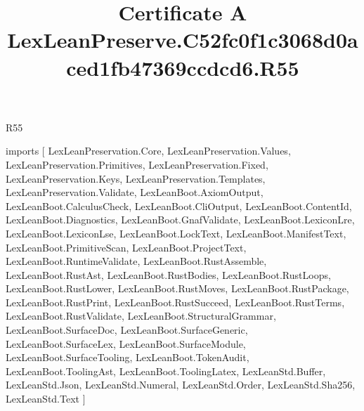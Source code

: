 \begin{lexlean}{R55}
\title{Certificate A LexLeanPreserve.C52fc0f1c3068d0aced1fb47369ccdcd6.R55}
\begin{coremodule}
imports [
  LexLeanPreservation.Core,
  LexLeanPreservation.Values,
  LexLeanPreservation.Primitives,
  LexLeanPreservation.Fixed,
  LexLeanPreservation.Keys,
  LexLeanPreservation.Templates,
  LexLeanPreservation.Validate,
  LexLeanBoot.AxiomOutput,
  LexLeanBoot.CalculusCheck,
  LexLeanBoot.CliOutput,
  LexLeanBoot.ContentId,
  LexLeanBoot.Diagnostics,
  LexLeanBoot.GnafValidate,
  LexLeanBoot.LexiconLre,
  LexLeanBoot.LexiconLse,
  LexLeanBoot.LockText,
  LexLeanBoot.ManifestText,
  LexLeanBoot.PrimitiveScan,
  LexLeanBoot.ProjectText,
  LexLeanBoot.RuntimeValidate,
  LexLeanBoot.RustAssemble,
  LexLeanBoot.RustAst,
  LexLeanBoot.RustBodies,
  LexLeanBoot.RustLoops,
  LexLeanBoot.RustLower,
  LexLeanBoot.RustMoves,
  LexLeanBoot.RustPackage,
  LexLeanBoot.RustPrint,
  LexLeanBoot.RustSucceed,
  LexLeanBoot.RustTerms,
  LexLeanBoot.RustValidate,
  LexLeanBoot.StructuralGrammar,
  LexLeanBoot.SurfaceDoc,
  LexLeanBoot.SurfaceGeneric,
  LexLeanBoot.SurfaceLex,
  LexLeanBoot.SurfaceModule,
  LexLeanBoot.SurfaceTooling,
  LexLeanBoot.TokenAudit,
  LexLeanBoot.ToolingAst,
  LexLeanBoot.ToolingLatex,
  LexLeanStd.Buffer,
  LexLeanStd.Json,
  LexLeanStd.Numeral,
  LexLeanStd.Order,
  LexLeanStd.Sha256,
  LexLeanStd.Text
]


\end{coremodule}
\end{lexlean}

